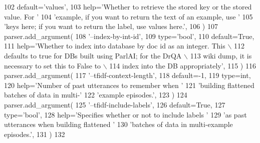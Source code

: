 \begin{DoxyCode}
102             default=\textcolor{stringliteral}{'values'},
103             help=\textcolor{stringliteral}{'Whether to retrieve the stored key or the stored value. For '}
104             \textcolor{stringliteral}{'example, if you want to return the text of an example, use '}
105             \textcolor{stringliteral}{'keys here; if you want to return the label, use values here.'},
106         )
107         parser.add\_argument(
108             \textcolor{stringliteral}{'--index-by-int-id'},
109             type=\textcolor{stringliteral}{'bool'},
110             default=\textcolor{keyword}{True},
111             help=\textcolor{stringliteral}{'Whether to index into database by doc id as an integer. This \(\backslash\)}
112 \textcolor{stringliteral}{                  defaults to true for DBs built using ParlAI; for the DrQA \(\backslash\)}
113 \textcolor{stringliteral}{                  wiki dump, it is necessary to set this to False to \(\backslash\)}
114 \textcolor{stringliteral}{                  index into the DB appropriately'},
115         )
116         parser.add\_argument(
117             \textcolor{stringliteral}{'--tfidf-context-length'},
118             default=-1,
119             type=int,
120             help=\textcolor{stringliteral}{'Number of past utterances to remember when '}
121             \textcolor{stringliteral}{'building flattened batches of data in multi-'}
122             \textcolor{stringliteral}{'example episodes.'},
123         )
124         parser.add\_argument(
125             \textcolor{stringliteral}{'--tfidf-include-labels'},
126             default=\textcolor{keyword}{True},
127             type=\textcolor{stringliteral}{'bool'},
128             help=\textcolor{stringliteral}{'Specifies whether or not to include labels '}
129             \textcolor{stringliteral}{'as past utterances when building flattened '}
130             \textcolor{stringliteral}{'batches of data in multi-example episodes.'},
131         )
132 
\end{DoxyCode}
\mbox{\label{classparlai_1_1agents_1_1tfidf__retriever_1_1tfidf__retriever_1_1TfidfRetrieverAgent_af3dec5fd8d3fb89229f00d919bfcd565}} 
